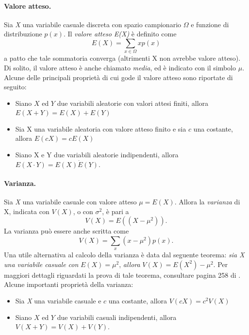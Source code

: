 \paragraph{Valore atteso.} Sia \textit{X} una variabile casuale discreta con spazio campionario $\Omega$ e funzione di distribuzione $p(x)$. Il \textit{valore atteso E(X)} è definito come
\begin{equation}
	E(X) = \sum_{x\in \Omega} x p(x)
\end{equation}
a patto che tale sommatoria converga (altrimenti X non avrebbe valore atteso).
Di solito, il valore atteso è anche chiamato \textit{media}, ed è indicato con il simbolo $\mu$. Alcune delle principali proprietà di cui gode il valore atteso sono riportate di seguito:
\begin{itemize}
	\item Siano $X$ ed $Y$ due variabili aleatorie con valori attesi finiti, allora $E(X+Y) = E(X) + E(Y)$
	\item Sia X una variabile aleatoria con valore atteso finito e sia $c$ una costante, allora $E(cX) = cE(X)$
	\item Siano X e Y due variabili aleatorie indipendenti, allora $E(X\cdot Y) = E(X) \dot E(Y)$.
\end{itemize}
\paragraph{Varianza.} Sia \textit{X} una variabile casuale con valore atteso $\mu = E(X)$. Allora la \textit{varianza} di X, indicata con $V(X)$, o con $\sigma^2$, è pari a
\begin{equation}
	V(X) = E((X - \mu^2)).
\end{equation}
La varianza può essere anche scritta come
\begin{equation}
	V(X) = \sum_x {(x - \mu^2)p(x)}.
\end{equation}
Una utile alternativa al calcolo della varianza è data dal seguente teorema: \textit{sia X una variabile casuale con} $E(X) = \mu^2$, \textit{allora} $V(X) = E(X^2) - \mu^2$. Per maggiori dettagli riguardati la prova di tale teorema, consultare pagina 258 di \cite{grinstead2012introduction}.\\
Alcune importanti proprietà della varianza:
\begin{itemize}
	\item Sia \textit{X} una variabile casuale e $c$ una costante, allora $V(cX) = c^2V(X)$
	\item Siano $X$ ed $Y$ due variabili casuali indipendenti, allora $V(X+Y) = V(X) + V(Y)$.
\end{itemize}
